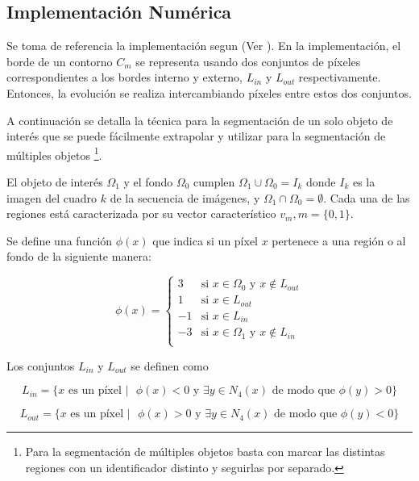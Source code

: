 \documentclass[a4paper,10pt]{article}
\begin{document}
\subsection{Implementación Numérica}

Se toma de referencia la implementación segun \citeauthor{fast-level-set} (Ver \cite{fast-level-set}).
En la implementación, el borde de un contorno $C_m$ se representa usando dos conjuntos de píxeles
correspondientes a los bordes interno y externo, $L_{in}$ y $L_{out}$
respectivamente. Entonces, la evolución se realiza intercambiando píxeles entre
estos dos conjuntos.

A continuación se detalla la técnica para la segmentación de un solo objeto de
interés que se puede fácilmente extrapolar y utilizar para la
segmentación de múltiples objetos
\footnote{Para la segmentación de múltiples objetos basta con marcar las distintas regiones con un identificador
distinto y seguirlas por separado.}.

El objeto de interés $\Omega_{1}$ y el fondo $\Omega_{0}$ cumplen
$\Omega_{1}\cup\Omega_{0} = I_{k}$ donde $I_{k}$ es la imagen del cuadro $k$ de
la secuencia de imágenes, y $\Omega_{1}\cap\Omega_{0} = \emptyset$. Cada una de
las regiones está caracterizada por su vector característico $v_{m}, m =
\{0,1\}$.

Se define una función $\phi(x)$ que indica si un píxel $x$ pertenece a una región o al fondo de la siguiente manera:

\begin{equation}
\phi(x) =
\left\{
    \begin{array}{ll}
        3  & \mbox{si } x \in \Omega_{0} \mbox{  y  } x \notin L_{out} \\
        1  & \mbox{si } x \in L_{out}\\
        -1  & \mbox{si } x \in L_{in}\\
        -3 & \mbox{si } x \in \Omega_{1} \mbox{  y  } x \notin L_{in} \\
    \end{array}
\right.
\end{equation}

Los conjuntos $L_{in}$ y $L_{out}$ se definen como

\begin{equation}
    L_{in} = \{ x \mbox{ es un píxel } \vert \mbox{    }  \phi(x) < 0 \mbox{ y } \exists y \in N_{4}(x) \mbox{ de modo que } \phi(y) > 0 \}
\end{equation}

\begin{equation}
    L_{out} = \{ x \mbox{ es un píxel } \vert \mbox{    } \phi(x) > 0 \mbox{ y } \exists y \in N_{4}(x) \mbox{ de modo que } \phi(y) < 0 \}
\end{equation}
\end{document}
